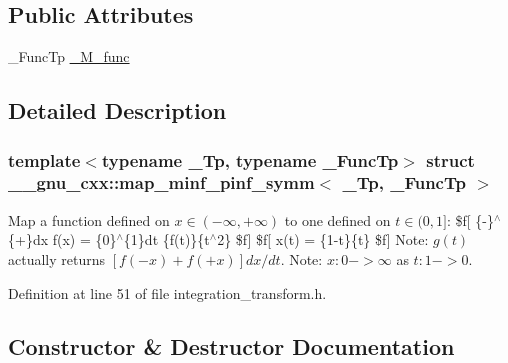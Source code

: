 \subsection*{Public Attributes}
\begin{DoxyCompactItemize}
\item 
\+\_\+\+Func\+Tp \hyperlink{struct____gnu__cxx_1_1map__minf__pinf__symm_a3e6d1d72fb8471f11573dc8b6ce835c6}{\+\_\+\+M\+\_\+func}
\end{DoxyCompactItemize}


\subsection{Detailed Description}
\subsubsection*{template$<$typename \+\_\+\+Tp, typename \+\_\+\+Func\+Tp$>$\newline
struct \+\_\+\+\_\+gnu\+\_\+cxx\+::map\+\_\+minf\+\_\+pinf\+\_\+symm$<$ \+\_\+\+Tp, \+\_\+\+Func\+Tp $>$}

Map a function defined on $ x \in (-\infty, +\infty) $ to one defined on $ t \in (0, 1] $\+: \$f\mbox{[} \{-\/\}$^\wedge$\{+\}dx f(x) = \{0\}$^\wedge$\{1\}dt \{f(t)\}\{t$^\wedge$2\} \$f\mbox{]} \$f\mbox{[} x(t) = \{1-\/t\}\{t\} \$f\mbox{]} Note\+: $ g(t) $ actually returns $ [f(-x) + f(+x)]dx/dt $. Note\+: $ x:0->\infty $ as $ t:1->0 $. 

Definition at line 51 of file integration\+\_\+transform.\+h.



\subsection{Constructor \& Destructor Documentation}
\mbox{\label{struct____gnu__cxx_1_1map__minf__pinf__symm_a31f5258be5cf1e1e9fc7b2157fe73461}} 

